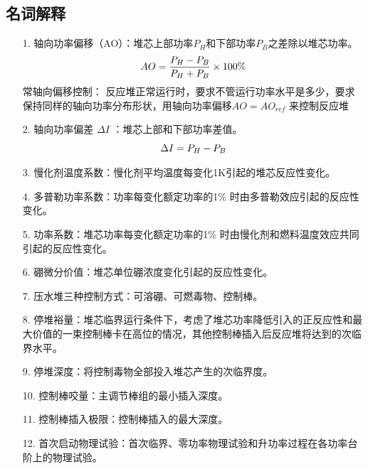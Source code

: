\documentclass[openany]{ctexart}
\numberwithin{equation}{section} %
\begin{document}
\subsection{名词解释}
\begin{itemize}
	
\item [1.]轴向功率偏移（AO）：堆芯上部功率$P_{H}$和下部功率$P_{B}$之差除以堆芯功率。
\begin{equation}
	\Large AO=\dfrac{P_{H}-P_{B}}{P_{H}+P_{B}} \times 100\%
\end{equation}
{\heiti 常轴向偏移控制：} 反应堆正常运行时，要求不管运行功率水平是多少，要求保持同样的轴向功率分布形状，用轴向功率偏移$ AO=AO_{ref}$ 来控制反应堆

\vspace{0.1cm}

\item [2.]轴向功率偏差 $\Delta I$ ：堆芯上部和下部功率差值。
\begin{equation}
   \Large  \Delta I = P_{H}-P_{B}
\end{equation}

\item [3.]慢化剂温度系数：慢化剂平均温度每变化1K引起的堆芯反应性变化。
\item [4.]多普勒功率系数：功率每变化额定功率的1\% 时由多普勒效应引起的反应性变化。
\item [5.]功率系数：堆芯功率每变化额定功率的1\% 时由慢化剂和燃料温度效应共同引起的反应性变化。
\item [6.]硼微分价值：堆芯单位硼浓度变化引起的反应性变化。
\item [7.] 压水堆三种控制方式：可溶硼、可燃毒物、控制棒。
\item [8.]停堆裕量：堆芯临界运行条件下，考虑了堆芯功率降低引入的正反应性和最大价值的一束控制棒卡在高位的情况，其他控制棒插入后反应堆将达到的次临界水平。
\item [9.]停堆深度：将控制毒物全部投入堆芯产生的次临界度。
\item [10.]控制棒咬量：主调节棒组的最小插入深度。
\item [11.]控制棒插入极限：控制棒插入的最大深度。
\item [12.]首次启动物理试验：首次临界、零功率物理试验和升功率过程在各功率台阶上的物理试验。
\end{itemize}
\end{document}
